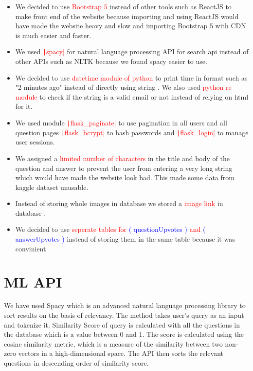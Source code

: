 \documentclass{article}
\begin{document}
\begin{itemize}
    \item We decided to use \textcolor{red}{Bootstrap 5} instead of other tools such as ReactJS to make front end of the website because importing and using ReactJS would have made the website heavy and slow and importing Bootstrap 5 with CDN is much easier and faster.
    \item We used  \textcolor{red}{\texttt|spacy|}  for natural language processing API for search api instead of other APIs such as NLTK because we found spacy easier to use.
    \item We decided to use \textcolor{red}{datetime module of python} to print time in format such as "2 minutes ago"  instead of directly using string . We also used \textcolor{red}{python re module} to check if the string is a valid email or not instead of relying on html for it.
    \item We used module \textcolor{red}{ \texttt|flask_paginate|} to use pagination in all users and all question pages   \textcolor{red}{\texttt|flask_bcrypt|} to hash passwords and \textcolor{red}{\texttt|flask_login|} to manage user sessions.
    \item We assigned a \textcolor{red}{limited number of characters} in the title and body of the question and answer to prevent the user from entering a very long string which would have made the website look bad. This made some data from kaggle dataset unusable.
    \item Instead of storing whole images in database we stored a \textcolor{red}{image link} in database .
    \item We decided to use \textcolor{red}{seperate tables for \textcolor{blue}{( questionUpvotes )} and \textcolor{blue}{( answerUpvotes )}} instead of storing them in the same table because it was convinient
\end{itemize}

\section{ML API}
We have used Spacy which is an advanced natural language processing library to sort results on the basis of relevancy.
The method takes user's query as an input and tokenize it.
Similarity Score of query is calculated with all the questions in the database which is a value between 0 and 1.
The score is calculated using the cosine similarity metric, which is a measure of the similarity between two non-zero vectors in a high-dimensional space.
The API then sorts the relevant questions in descending order of similarity score.
\end{document}
